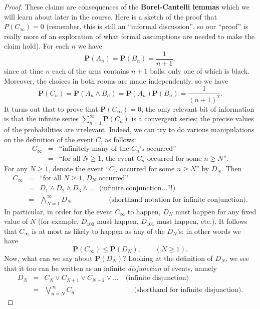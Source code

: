 \documentclass[12pt]{article}
\newcommand{\prob}{\mathbf{P}}
\theoremstyle{example}
\begin{document}
\begin{proof}
These claims are consequences of the \textbf{Borel-Cantelli lemmas} which we will learn about later in the course. Here is a sketch of the proof that $P(C_\infty)=0$ (remember, this is still an ``informal discussion'', so our ``proof'' is really more of an exploration of what formal assumptions are needed to make the claim hold). For each $n$ we have
$$ \prob(A_n) = \prob(B_n) = \frac{1}{n+1}, $$
since at time $n$ each of the urns contains $n+1$ balls, only one of which is black. Moreover, the choices in both rooms are made independently, so we have
$$ \prob(C_n) = \prob(A_n \wedge B_n) = \prob(A_n) \prob(B_n) = \frac{1}{(n+1)^2}. $$
It turns out that to prove that $\prob(C_\infty)=0$, the only relevant bit of information is that the infinite series $\sum_{n=1}^\infty \prob(C_n)$ is a convergent series; the precise values of the probabilities are irrelevant. Indeed, we can try to do various manipulations on the definition of the event $C$, as follows:
\begin{eqnarray*}
C_\infty &=& \textrm{``infinitely many of the $C_n$'s occurred''} \\
&=& \textrm{``for all $N\ge 1$, the event $C_n$ occurred for some $n\ge N$''.}
\end{eqnarray*}
For any $N\ge 1$, denote the event ``$C_n$ occurred for some $n\ge N$'' by $D_N$. Then
\begin{eqnarray*}
C_\infty &=& \textrm{``for all $N\ge 1$, $D_N$ occurred''}
\\ &=& D_1 \wedge D_2 \wedge D_3 \wedge \ldots \ \ \, \textrm{(infinite conjunction...?!)}
\\ &=& \bigwedge_{N=1}^\infty D_N \quad \qquad \quad\ \ \ \ \ \ \textrm{(shorthand notation for infinite conjunction)}.
\end{eqnarray*}
In particular, in order for the event $C_\infty$ to happen, $D_N$ must happen for any fixed value of $N$ (for example, $D_{100}$ must happen, $D_{101}$ must happen, etc.). It follows that $C_\infty$ is at most as likely to happen as any of the $D_N$'s; in other words we have 
$$ \prob(C_\infty) \le \prob(D_N), \qquad (N\ge 1). $$
Now, what can we say about $\prob(D_N)$? Looking at the definition of $D_N$, we see that it too can be written as an infinite \emph{disjunction} of events, namely
\begin{eqnarray*}
D_N &=& C_N \vee C_{N+1} \vee C_{N+2} \vee \ldots \quad \textrm{(infinite disjunction)} \\
&=& \bigvee_{n=N}^\infty C_n \qquad\qquad\qquad\qquad\ \  \textrm{(shorthand for infinite disjunction)}. 

\end{eqnarray*}
\end{proof}
\end{document}
